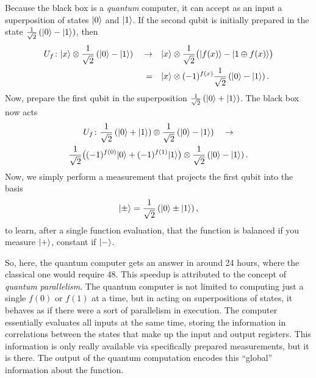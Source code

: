 Because the black box is a {\sl quantum} computer, it can accept
as an input a superposition of states ${|{0}\rangle}$ and ${|{1}\rangle}$.
If the second qubit is initially prepared in the state
$\frac{1}{\sqrt{2}}\left( {|{0}\rangle} - {|{1}\rangle} \right)$, then
\begin{equation}
\begin{split}
U_f\colon {|{x}\rangle}\otimes\frac{1}{\sqrt{2}}\left( {|{0}\rangle} - {|{1}\rangle} \right)
\quad\to&\quad{|{x}\rangle}\otimes\frac{1}{\sqrt{2}}\bigl({|{f(x)}\rangle} - {|{1\oplus f(x)}\rangle}\bigr)\\
=&\quad{|{x}\rangle}\otimes(-1)^{f(x)}\frac{1}{\sqrt{2}}\left( {|{0}\rangle} - {|{1}\rangle} \right).
\end{split}
\end{equation}
Now, prepare the first qubit in the superposition 
$\frac{1}{\sqrt{2}}\left( {|{0}\rangle} + {|{1}\rangle} \right)$.
The black box now acts
\begin{multline}
U_f\colon \frac{1}{\sqrt{2}}\left( {|{0}\rangle} + {|{1}\rangle} \right)
        \otimes\frac{1}{\sqrt{2}}\left( {|{0}\rangle} - {|{1}\rangle} \right) \quad\to\\
        \frac{1}{\sqrt{2}}\bigl( (-1)^{f(0)}{|{0}\rangle} + (-1)^{f(1)}{|{1}\rangle} \bigr)
        \otimes\frac{1}{\sqrt{2}}\left( {|{0}\rangle} - {|{1}\rangle} \right).
\end{multline}
Now, we simply perform a measurement that projects the first qubit into
the basis
\begin{equation}
{|{\pm}\rangle} = \frac{1}{\sqrt{2}}\left( {|{0}\rangle} \pm {|{1}\rangle} \right),
\end{equation}
to learn, after a single function evaluation, that the function is
balanced if you measure ${|{+}\rangle}$, constant if ${|{-}\rangle}$.

So, here, the quantum computer gets an answer in around 24 hours, where
the classical one would require 48.  This speedup is attributed to
the concept of \emph{quantum parallelism}.  The quantum computer is not
limited to computing just a single $f(0)$ or $f(1)$ at a time, but in acting on
superpositions of states, it behaves as if there were a sort of 
parallelism in execution.  The computer essentially evaluates all inputs
at the same time, storing the information in correlations between the states
that make up the input and output registers.  This information
is only really available via specifically prepared measurements, but it is
there.  The output of the quantum computation encodes this ``global''
information about the function.

